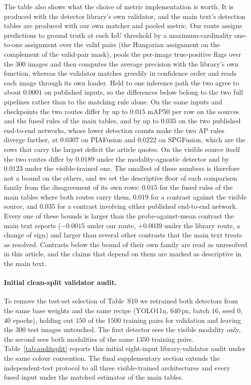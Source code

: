 \documentclass[11pt,a4paper]{article}
\begin{document}
The table also shows what the choice of metric implementation is worth. It is
produced with the detector library's own validator, and the main text's detection
tables are produced with our own matcher and pooled metric. Our route assigns
predictions to ground truth at each IoU threshold by a maximum-cardinality one-to-one
assignment over the valid pairs (the Hungarian assignment on the complement of the
valid-pair mask), pools the per-image true-positive flags over the 300 images and then
computes the average precision with the library's own function, whereas the validator
matches greedily in confidence order and reads each image through its own loader. Held
to one inference path the two agree to about $0.0001$ on published inputs, so the
differences below belong to the two full pipelines rather than to the matching rule
alone. On the same inputs and
checkpoints the two routes differ by up to $0.015$ mAP50 per row on the sources and
the fused rules of the main tables, and by up to $0.035$ on the two published
end-to-end networks, whose lower detection counts make the two AP rules diverge
further, at $0.0307$ on PIAFusion and $0.0222$ on SPGFusion, which are the rows that
carry the largest deficit the article quotes. On the visible source itself the two
routes differ by $0.0189$ under the modality-agnostic detector and by $0.0123$ under
the visible-trained one. The smallest of these numbers is therefore not a bound on
the others, and we set the descriptive floor of each comparison family from the
disagreement of its own rows: $0.015$ for the fused rules of the main tables where
both routes carry them, $0.019$ for a contrast against the visible source, and
$0.035$ for a contrast involving either published end-to-end network. Every one of
these bounds is larger than the probe-against-mean contrast the main text reports
($-0.0015$ under our route, $+0.0039$ under the library route, a change of sign) and
larger than several other contrasts that the main text treats as resolved. Contrasts
below the bound of their own family are read as unresolved in this article, and the
claims that depend on them are marked as descriptive in the main text.

\paragraph{Initial clean-split validator audit.}
To remove the test-set selection of Table~S10 we retrained both
detectors from the same base weights and the same recipe (YOLO11n, $640$\,px, batch
$16$, seed $0$, $40$ epochs), holding out $150$ of the $1500$ training pairs for
validation and leaving the $300$ test images untouched. The first detector sees the
visible modality only, the second sees both modalities of the same $1350$ training
pairs. Table~\ref{tab:auditsplit} reports this initial eight-input library-validator
audit under the same colour convention. The final supplementary section extends the
independent-test protocol to all three visible-trained architectures and every fused
input under the matched estimator of the main tables.
\end{document}
